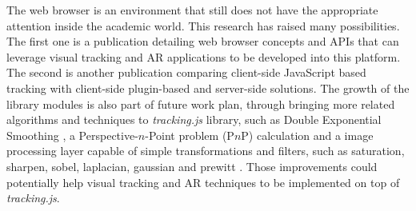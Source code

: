 The web browser is an environment that still does not have the appropriate attention inside the academic world. This research has raised many possibilities. The first one is a publication detailing web browser concepts and APIs that can leverage visual tracking and AR applications to be developed into this platform. The second is another publication comparing client-side JavaScript based tracking with client-side plugin-based and server-side solutions. The growth of the library modules is also part of future work plan, through bringing more related algorithms and techniques to \textit{tracking.js} library, such as Double Exponential Smoothing \cite{LaViola2003}, a Perspective-$n$-Point problem (P$n$P) calculation and a image processing layer capable of simple transformations and filters, such as saturation, sharpen, sobel, laplacian, gaussian and prewitt \cite{Gonzalez2007}. Those improvements could potentially help visual tracking and AR techniques to be implemented on top of \textit{tracking.js}.


